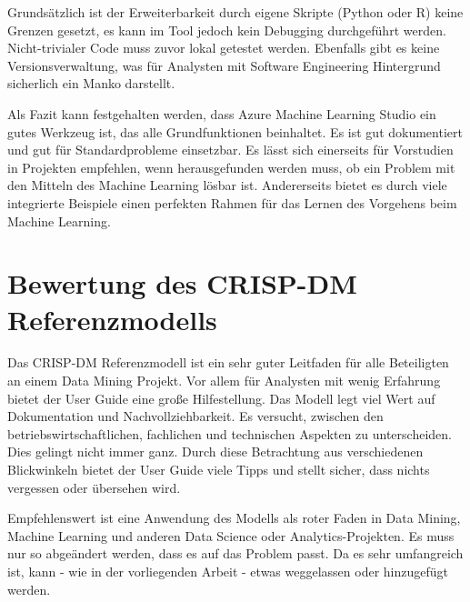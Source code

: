 Grundsätzlich ist der Erweiterbarkeit durch eigene Skripte (Python oder R) keine Grenzen gesetzt, es kann im Tool jedoch kein Debugging durchgeführt werden. Nicht-trivialer Code muss zuvor lokal getestet werden. Ebenfalls gibt es keine Versionsverwaltung, was für Analysten mit Software Engineering Hintergrund sicherlich ein Manko darstellt.\par
Als Fazit kann festgehalten werden, dass Azure Machine Learning Studio ein gutes Werkzeug ist, das alle Grundfunktionen beinhaltet. Es ist gut dokumentiert und gut für Standardprobleme einsetzbar. Es lässt sich einerseits für Vorstudien in Projekten empfehlen, wenn herausgefunden werden muss, ob ein Problem mit den Mitteln des Machine Learning lösbar ist. Andererseits bietet es durch viele integrierte Beispiele einen perfekten Rahmen für das Lernen des Vorgehens beim Machine Learning.

\section{Bewertung des CRISP-DM Referenzmodells}\label{sec:BeswertungCrisp}
Das CRISP-DM Referenzmodell ist ein sehr guter Leitfaden für alle Beteiligten an einem Data Mining Projekt. Vor allem für Analysten mit wenig Erfahrung bietet der User Guide eine große Hilfestellung. Das Modell legt viel Wert auf Dokumentation und Nachvollziehbarkeit. Es versucht, zwischen den betriebswirtschaftlichen, fachlichen und technischen Aspekten zu unterscheiden. Dies gelingt nicht immer ganz. Durch diese Betrachtung aus verschiedenen Blickwinkeln bietet der User Guide viele Tipps und stellt sicher, dass nichts vergessen oder übersehen wird.\par
Empfehlenswert ist eine Anwendung des Modells als roter Faden in Data Mining, Machine Learning und anderen Data Science oder Analytics-Projekten. Es muss nur so abgeändert werden, dass es auf das Problem passt. Da es sehr umfangreich ist, kann - wie in der vorliegenden Arbeit - etwas weggelassen oder hinzugefügt werden.

